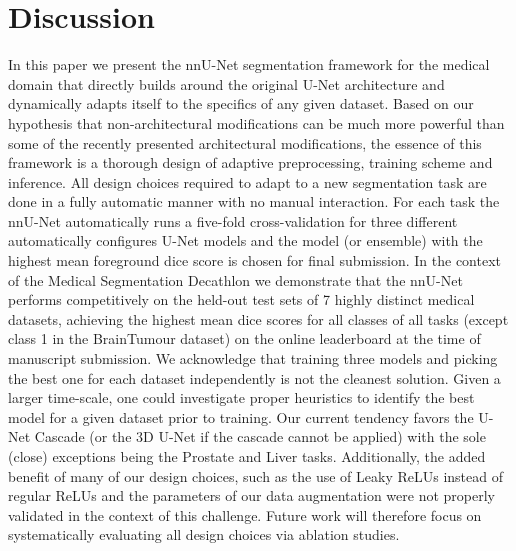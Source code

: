 \documentclass{templates/llncs}
\begin{document}
\section{Discussion}
In this paper we present the nnU-Net segmentation framework for the medical domain that directly builds around the original U-Net architecture \cite{ronneberger2015u} and dynamically adapts itself to the specifics of any given dataset. 
Based on our hypothesis that non-architectural modifications can be much more powerful than some of the recently presented architectural modifications, the essence of this framework is a thorough design of adaptive preprocessing, training scheme and inference. All design choices required to adapt to a new segmentation task are done in a fully automatic manner with no manual interaction.
For each task the nnU-Net automatically runs a five-fold cross-validation for three different automatically configures U-Net models and the model (or ensemble) with the highest mean foreground dice score is chosen for final submission. 
In the context of the Medical Segmentation Decathlon we demonstrate that the nnU-Net performs competitively on the held-out test sets of 7 highly distinct medical datasets, achieving the highest mean dice scores for all classes of all tasks (except class 1 in the BrainTumour dataset) on the online leaderboard at the time of manuscript submission. We acknowledge that training three models and picking the best one for each dataset independently is not the cleanest solution. Given a larger time-scale, one could investigate proper heuristics to identify the best model for a given dataset prior to training. Our current tendency favors the U-Net Cascade (or the 3D U-Net if the cascade cannot be applied) with the sole (close) exceptions being the Prostate and Liver tasks. Additionally, the added benefit of many of our design choices, such as the use of Leaky ReLUs instead of regular ReLUs and the parameters of our data augmentation were not properly validated in the context of this challenge. Future work will therefore focus on systematically evaluating all design choices via ablation studies.



\end{document}
